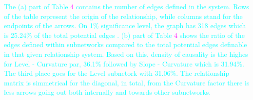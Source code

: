 \documentclass[12pt,bibliography=totoc]{article}
\begin{document}

\bigskip


\textcolor{cyan}{The (a) part of Table \textcolor{magenta}{4} contains the number of edges defined in the system. Rows of the table represent the origin of the relationship, while columns stand for the endpoints of the arrows. On 1\% significance level, the graph has 318 edges which is 25.24\% of the total potential edges . (b) part of Table \textcolor{magenta}{4} shows the ratio of the edges defined within subnetworks compared to the total potential edges definable in that given relationship system. Based on this, density of causality is the highes for Level - Curvature par, 36.1\% followed by Slope - Curvature which is 31.94\%. The third place goes for the Level subnetork with 31.06\%. The relationship matrix is simmetrical for the diagonal, in total, from the Curvature factor there is less arrows going out both internally and towards other subnetworks.}

\end{document}

